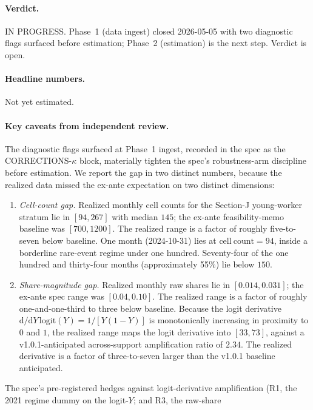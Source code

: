 \paragraph{Verdict.} IN PROGRESS. Phase~1 (data ingest) closed
2026-05-05 with two diagnostic flags surfaced before estimation;
Phase~2 (estimation) is the next step. Verdict is open.

\paragraph{Headline numbers.} Not yet estimated.

\paragraph{Key caveats from independent review.} The diagnostic flags
surfaced at Phase~1 ingest, recorded in the spec as the
CORRECTIONS-\(\kappa\) block, materially tighten the spec's
robustness-arm discipline before estimation. We report the gap in two
distinct numbers, because the realized data missed the ex-ante
expectation on two distinct dimensions:
\begin{enumerate}
  \item \emph{Cell-count gap.} Realized monthly cell counts for the
    Section-J young-worker stratum lie in \([94, 267]\) with median
    \(145\); the ex-ante feasibility-memo baseline was \([700, 1200]\).
    The realized range is a factor of roughly five-to-seven below
    baseline. One month (2024-10-31) lies at \(\mathrm{cell\ count}
    = 94\), inside a borderline rare-event regime under one hundred.
    Seventy-four of the one hundred and thirty-four months
    (approximately 55\%) lie below \(150\).
  \item \emph{Share-magnitude gap.} Realized monthly raw shares lie in
    \([0.014, 0.031]\); the ex-ante spec range was \([0.04, 0.10]\).
    The realized range is a factor of roughly one-and-one-third to
    three below baseline. Because the logit derivative
    \(\mathrm{d}/\mathrm{d}Y\,\mathrm{logit}(Y) = 1/[Y(1-Y)]\) is
    monotonically increasing in proximity to \(0\) and \(1\), the
    realized range maps the logit derivative into \([33, 73]\), against
    a v1.0.1-anticipated across-support amplification ratio of
    \(2.34\). The realized derivative is a factor of three-to-seven
    larger than the v1.0.1 baseline anticipated.
\end{enumerate}
The spec's pre-registered hedges against logit-derivative amplification
(R1, the 2021 regime dummy on the logit-\(Y\); and R3, the raw-share
